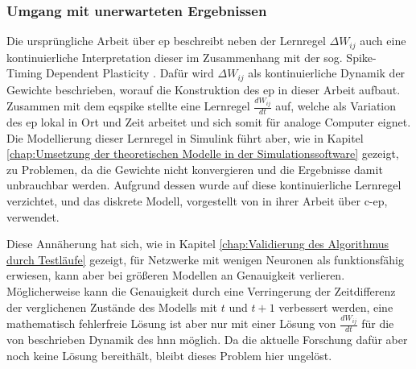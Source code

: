 \subsubsection{Umgang mit unerwarteten Ergebnissen}

Die ursprüngliche Arbeit über \ac{ep} beschreibt neben der Lernregel \(\Delta W_{ij}\) auch eine kontinuierliche Interpretation dieser im Zusammenhang mit der sog. Spike-Timing Dependent Plasticity \cite{Scellier2017}. Dafür wird \(\Delta W_{ij}\) als kontinuierliche Dynamik der Gewichte beschrieben, worauf die Konstruktion des \ac{ep} in dieser Arbeit aufbaut. Zusammen mit dem \ac{eqspike} stellte \citeauthor{Martin2020} eine Lernregel \(\frac{dW_{ij}}{dt}\) auf, welche als Variation des \ac{ep} lokal in Ort und Zeit arbeitet und sich somit für analoge Computer eignet. Die Modellierung dieser Lernregel in Simulink führt aber, wie in Kapitel \ref{chap:Umsetzung der theoretischen Modelle in der Simulationssoftware} gezeigt, zu Problemen, da die Gewichte nicht konvergieren und die Ergebnisse damit unbrauchbar werden. Aufgrund dessen wurde auf diese kontinuierliche Lernregel verzichtet, und das diskrete Modell, vorgestellt von \citeauthor{Ernoult2020} in ihrer Arbeit über \ac{c-ep}, verwendet.

Diese Annäherung hat sich, wie in Kapitel \ref{chap:Validierung des Algorithmus durch Testläufe} gezeigt, für Netzwerke mit wenigen Neuronen als funktionsfähig erwiesen, kann aber bei größeren Modellen an Genauigkeit verlieren. Möglicherweise kann die Genauigkeit durch eine Verringerung der Zeitdifferenz der verglichenen Zustände des Modells mit \(t\) und \(t+1\) verbessert werden, eine mathematisch fehlerfreie Lösung ist aber nur mit einer Lösung von \(\frac{dW_{ij}}{dt}\) für die von \citeauthor{Scellier2017} beschrieben Dynamik des \ac{hnn} möglich. Da die aktuelle Forschung dafür aber noch keine Lösung bereithält, bleibt dieses Problem hier ungelöst.
